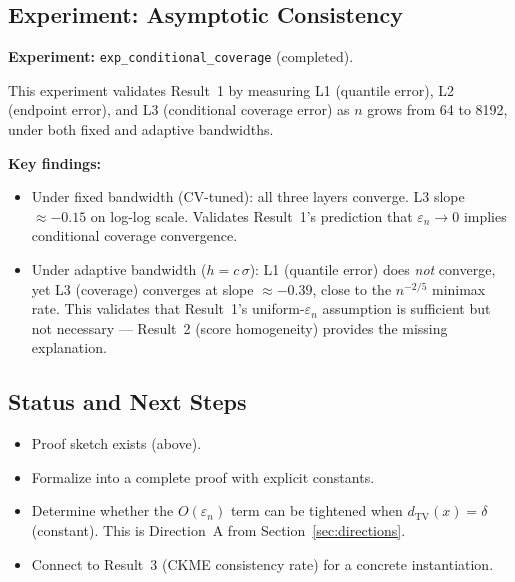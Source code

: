 \documentclass[11pt]{article}
\begin{document}
\subsection{Experiment: Asymptotic Consistency}
\label{sec:exp-consistency}

\textbf{Experiment:} \texttt{exp\_conditional\_coverage} (completed).

This experiment validates Result~1 by measuring L1 (quantile error),
L2 (endpoint error), and L3 (conditional coverage error) as $n$ grows
from 64 to 8192, under both fixed and adaptive bandwidths.

\textbf{Key findings:}
\begin{itemize}
  \item Under fixed bandwidth (CV-tuned): all three layers converge.
    L3 slope $\approx -0.15$ on log-log scale. Validates
    Result~1's prediction that $\varepsilon_n \to 0$ implies
    conditional coverage convergence.
  \item Under adaptive bandwidth ($h = c\,\sigma$): L1 (quantile error)
    does \emph{not} converge, yet L3 (coverage) converges at slope
    $\approx -0.39$, close to the $n^{-2/5}$ minimax rate. This
    validates that Result~1's uniform-$\varepsilon_n$ assumption is
    sufficient but not necessary --- Result~2 (score homogeneity)
    provides the missing explanation.
\end{itemize}

\subsection{Status and Next Steps}

\begin{itemize}
  \item[$\checkmark$] Proof sketch exists (above).
  \item[$\square$] Formalize into a complete proof with explicit constants.
  \item[$\square$] Determine whether the $O(\varepsilon_n)$ term can be
    tightened when $d_{\mathrm{TV}}(x) = \delta$ (constant). This is
    Direction~A from Section~\ref{sec:directions}.
  \item[$\square$] Connect to Result~3 (CKME consistency rate) for a
    concrete instantiation.
\end{itemize}
\end{document}
